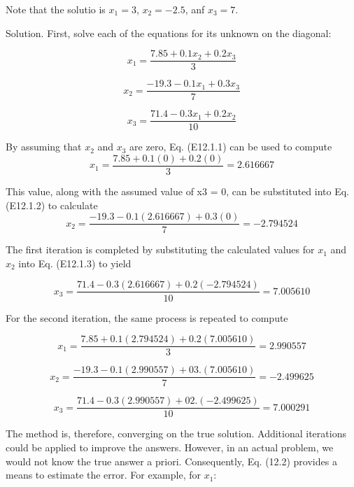 \documentclass[../main.tex]{subfiles}
\begin{document}
Note that the solutio is $x_{1}=3$, $x_{2}=-2.5$, anf $x_{3}=7$.

Solution. First, solve each of the equations for its unknown on the diagonal:

\begin{equation}
x_{1}=\frac{7.85+0.1x_{2}+0.2x_{3}}{3} \tag{E12.1.1}
\end{equation}

\begin{equation}
x_{2}=\frac{-19.3-0.1x_{1}+0.3x_{3}}{7} \tag{E12.1.2}
\end{equation}

\begin{equation}
x_{3}=\frac{71.4-0.3x_{1}+0.2x_{2}}{10}  \tag{E12.1.3}
\end{equation}

By assuming that $x_{2}$ and $x_{3}$ are zero, Eq. (E12.1.1) can be used to compute
\begin{equation}
x_{1}=\frac{7.85+0.1(0)+0.2(0)}{3}=2.616667
\end{equation}

This value, along with the assumed value of x3 = 0, can be substituted into Eq. (E12.1.2)
to calculate
\begin{equation}
x_{2}=\frac{-19.3-0.1(2.616667)+0.3(0)}{7}=-2.794524
\end{equation}

The first iteration is completed by substituting the calculated values for $x_{1}$ and $x_{2}$ into
Eq. (E12.1.3) to yield

\begin{equation}
x_{3}=\frac{71.4-0.3(2.616667)+0.2(-2.794524)}{10}=7.005610
\end{equation}

For the second iteration, the same process is repeated to compute

\begin{equation}
x_{1}=\frac{7.85+0.1(2.794524)+0.2(7.005610)}{3}=2.990557
\end{equation}

\begin{equation}
x_{2}=\frac{-19.3-0.1(2.990557)+03.(7.005610)}{7}=-2.499625
\end{equation}

\begin{equation}
x_{3}=\frac{71.4-0.3(2.990557)+02.(-2.499625)}{10}=7.000291
\end{equation}

The method is, therefore, converging on the true solution. Additional iterations could be
applied to improve the answers. However, in an actual problem, we would not know the
true answer a priori. Consequently, Eq. (12.2) provides a means to estimate the error. For
example, for $x_{1}$:
\end{document}
